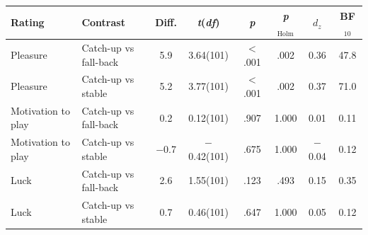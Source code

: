 \begin{tabular}{llcccccc}
\toprule
Rating & Contrast & Diff. & \textit{t}(\textit{df}) & \textit{p} & \textit{p}$_{\text{Holm}}$ & $d_z$ & BF$_{10}$ \\
\midrule
Pleasure & Catch-up vs fall-back & 5.9 & 3.64(101) & $<$ .001 & .002 & 0.36 & 47.8 \\
Pleasure & Catch-up vs stable & 5.2 & 3.77(101) & $<$ .001 & .002 & 0.37 & 71.0 \\
Motivation to play & Catch-up vs fall-back & 0.2 & 0.12(101) & .907 & 1.000 & 0.01 & 0.11 \\
Motivation to play & Catch-up vs stable & $-$0.7 & $-$0.42(101) & .675 & 1.000 & $-$0.04 & 0.12 \\
Luck & Catch-up vs fall-back & 2.6 & 1.55(101) & .123 & .493 & 0.15 & 0.35 \\
Luck & Catch-up vs stable & 0.7 & 0.46(101) & .647 & 1.000 & 0.05 & 0.12 \\
\bottomrule
\end{tabular}
